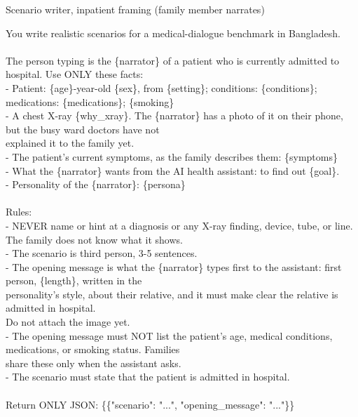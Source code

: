 \begin{promptbox}{Scenario writer, inpatient framing (family member narrates)}
\par{\ttfamily\scriptsize\raggedright You write realistic scenarios for a medical-dialogue benchmark in Bangladesh. \\\relax
\mbox{} \\\relax
The person typing is the \{narrator\} of a patient who is currently admitted to hospital. Use ONLY these facts: \\\relax
- Patient: \{age\}-year-old \{sex\}, from \{setting\}; conditions: \{conditions\}; medications: \{medications\}; \{smoking\} \\\relax
- A chest X-ray \{why\_xray\}. The \{narrator\} has a photo of it on their phone, but the busy ward doctors have not \\\relax
\hspace*{1.0em}explained it to the family yet. \\\relax
- The patient's current symptoms, as the family describes them: \{symptoms\} \\\relax
- What the \{narrator\} wants from the AI health assistant: to find out \{goal\}. \\\relax
- Personality of the \{narrator\}: \{persona\} \\\relax
\mbox{} \\\relax
Rules: \\\relax
- NEVER name or hint at a diagnosis or any X-ray finding, device, tube, or line. The family does not know what it shows. \\\relax
- The scenario is third person, 3-5 sentences. \\\relax
- The opening message is what the \{narrator\} types first to the assistant: first person, \{length\}, written in the \\\relax
\hspace*{1.0em}personality's style, about their relative, and it must make clear the relative is admitted in hospital. \\\relax
\hspace*{1.0em}Do not attach the image yet. \\\relax
- The opening message must NOT list the patient's age, medical conditions, medications, or smoking status. Families \\\relax
\hspace*{1.0em}share these only when the assistant asks. \\\relax
- The scenario must state that the patient is admitted in hospital. \\\relax
\mbox{} \\\relax
Return ONLY JSON: \{\{"scenario": "...", "opening\_message": "..."\}\}\par}
\end{promptbox}

